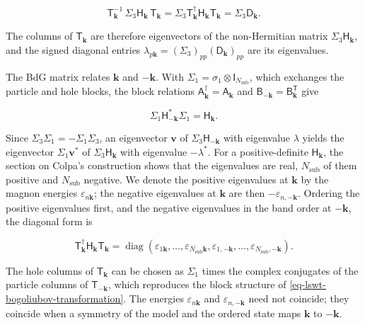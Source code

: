 \[
\mathsf T_{\mathbf k}^{-1}\,\Sigma_3\mathsf H_{\mathbf k}\,\mathsf T_{\mathbf k}
=\Sigma_3\mathsf T_{\mathbf k}^\dagger\mathsf H_{\mathbf k}\mathsf T_{\mathbf k}
=\Sigma_3\mathsf D_{\mathbf k}.
\]

The columns of \(\mathsf T_{\mathbf k}\) are therefore eigenvectors of the non-Hermitian matrix \(\Sigma_3\mathsf H_{\mathbf k}\), and the signed diagonal entries \(\lambda_{p\mathbf k}=(\Sigma_3)_{pp}(\mathsf D_{\mathbf k})_{pp}\) are its eigenvalues.

The BdG matrix relates \(\mathbf k\) and \(-\mathbf k\). With \(\Sigma_1=\sigma_1\otimes\mathsf I_{N_{\mathrm{sub}}}\), which exchanges the particle and hole blocks, the block relations \(\mathsf A_{\mathbf k}^\dagger=\mathsf A_{\mathbf k}\) and \(\mathsf B_{-\mathbf k}=\mathsf B_{\mathbf k}^{\mathsf T}\) give

\begin{equation}\label{eq-lswt-bdg-particle-hole-symmetry}
\Sigma_1\mathsf H_{-\mathbf k}^*\Sigma_1=\mathsf H_{\mathbf k}.
\end{equation}

Since \(\Sigma_3\Sigma_1=-\Sigma_1\Sigma_3\), an eigenvector \(\mathbf v\) of \(\Sigma_3\mathsf H_{-\mathbf k}\) with eigenvalue \(\lambda\) yields the eigenvector \(\Sigma_1\mathbf v^*\) of \(\Sigma_3\mathsf H_{\mathbf k}\) with eigenvalue \(-\lambda^*\). For a positive-definite \(\mathsf H_{\mathbf k}\), the section on Colpa's construction shows that the eigenvalues are real, \(N_{\mathrm{sub}}\) of them positive and \(N_{\mathrm{sub}}\) negative. We denote the positive eigenvalues at \(\mathbf k\) by the magnon energies \(\varepsilon_{n\mathbf k}\); the negative eigenvalues at \(\mathbf k\) are then \(-\varepsilon_{n,-\mathbf k}\). Ordering the positive eigenvalues first, and the negative eigenvalues in the band order at \(-\mathbf k\), the diagonal form is

\begin{equation}\label{eq-lswt-bdg-diagonal-form}
\mathsf T_{\mathbf k}^\dagger\mathsf H_{\mathbf k}\mathsf T_{\mathbf k}
=\operatorname{diag}\!\left(\varepsilon_{1\mathbf k},\ldots,\varepsilon_{N_{\mathrm{sub}}\mathbf k},\varepsilon_{1,-\mathbf k},\ldots,\varepsilon_{N_{\mathrm{sub}},-\mathbf k}\right).
\end{equation}

The hole columns of \(\mathsf T_{\mathbf k}\) can be chosen as \(\Sigma_1\) times the complex conjugates of the particle columns of \(\mathsf T_{-\mathbf k}\), which reproduces the block structure of \eqref{eq-lswt-bogoliubov-transformation}. The energies \(\varepsilon_{n\mathbf k}\) and \(\varepsilon_{n,-\mathbf k}\) need not coincide; they coincide when a symmetry of the model and the ordered state maps \(\mathbf k\) to \(-\mathbf k\).

